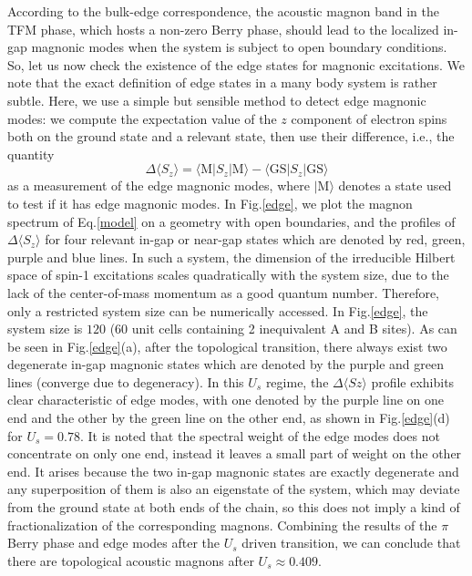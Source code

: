 \documentclass[amsmath,superscriptaddress,showpacs,aps,prb,twocolumn]{revtex4-1}
\begin{document}
\par According to the bulk-edge correspondence, the acoustic magnon band in the TFM phase, which hosts a non-zero Berry phase, should lead to the localized in-gap magnonic modes when the system is subject to open boundary conditions. So, let us now check the existence of the edge states for magnonic excitations. We note that the exact definition of edge states in a many body system is rather subtle\cite{LGLW_NJP2017}. Here, we use a simple but sensible method to detect edge magnonic modes: we compute the expectation value of the $z$ component of electron spins both on the ground state and a relevant state, then use their difference, i.e., the quantity
\begin{equation}
\Delta\langle S_z\rangle=\langle\text{M}|S_z|\text{M}\rangle-\langle\text{GS}|S_z|\text{GS}\rangle
\end{equation}
as a measurement of the edge magnonic modes, where $|\text{M}\rangle$ denotes a state used to test if it has edge magnonic modes. In Fig.\ref{edge}, we plot the magnon spectrum of Eq.\ref{model} on a geometry with open boundaries, and the profiles of $\Delta\langle S_z\rangle$ for four relevant in-gap or near-gap states which are denoted by red, green, purple and blue lines. In such a system, the dimension of the irreducible Hilbert space of spin-1 excitations scales quadratically with the system size, due to the lack of the center-of-mass momentum as a good quantum number. Therefore, only a restricted system size can be numerically accessed. In Fig.\ref{edge}, the system size is $120$ ($60$ unit cells containing 2 inequivalent A and B sites). As can be seen in Fig.\ref{edge}(a), after the topological transition, there always exist two degenerate in-gap magnonic states which are denoted by the purple and green lines (converge due to degeneracy). In this $U_s$ regime, the $\Delta\langle Sz\rangle$ profile exhibits clear characteristic of edge modes, with one denoted by the purple line on one end and the other by the green line on the other end, as shown in Fig.\ref{edge}(d) for $U_s=0.78$. It is noted that the spectral weight of the edge modes does not concentrate on only one end, instead it leaves a small part of weight on the other end. It arises because the two in-gap magnonic states are exactly degenerate and any superposition of them is also an eigenstate of the system, which may deviate from the ground state at both ends of the chain, so this does not imply a kind of fractionalization of the corresponding magnons. Combining the results of the $\pi$ Berry phase and edge modes after the $U_{s}$ driven transition, we can conclude that there are topological acoustic magnons after $U_{s}\approx 0.409$.
\end{document}
